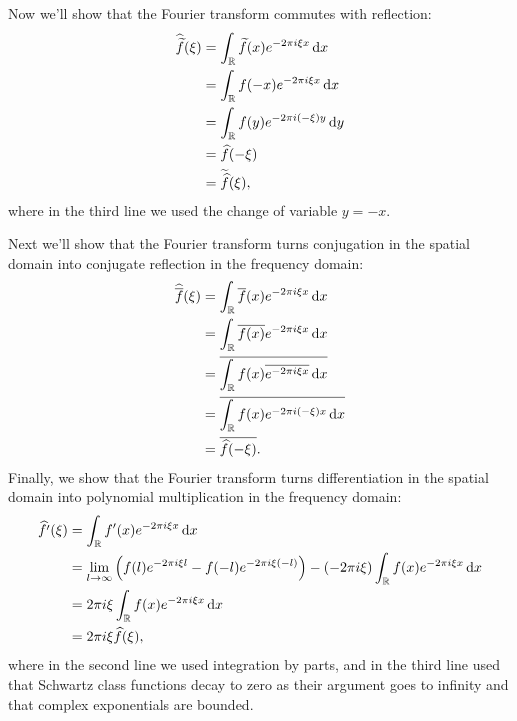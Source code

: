 \documentclass{article}
\newcommand{\R}{\mathbb{R}}
\begin{document}
Now we'll show that the Fourier transform commutes with reflection:
%
\begin{align*}
    \widehat{\widetilde{f}}(\xi)
        &= \int_{\R} \widetilde{f}(x) e^{- 2 \pi i \xi x} \dif x \\
        &= \int_{\R} f(-x) e^{- 2 \pi i \xi x} \dif x \\
        &= \int_{\R} f(y) e^{- 2 \pi i (- \xi) y} \dif y \\
        &= \widehat{f}(- \xi) \\
        &= \widetilde{\widehat{f}}(\xi)
        ,
\end{align*}
%
where in the third line we used the change of variable $y = - x$.

Next we'll show that the Fourier transform turns conjugation in the
spatial domain into conjugate reflection in the frequency domain:
%
\begin{align*}
    \widehat{\overline{f}}(\xi)
        &= \int_{\R} \overline{f}(x) e^{- 2 \pi i \xi x} \dif x \\
        &= \int_{\R} \overline{f(x)} e^{- 2 \pi i \xi x} \dif x \\
        &= \overline{\int_{\R} f(x) \overline{e^{- 2 \pi i \xi x}} \dif x} \\
        &= \overline{\int_{\R} f(x) e^{- 2 \pi i (- \xi) x} \dif x} \\
        &= \overline{\widehat{f}(-\xi)}
        .
\end{align*}
%
Finally, we show that the Fourier transform turns differentiation in
the spatial domain into polynomial multiplication in the frequency domain:
%
\begin{align*}
    \widehat{f^\prime}(\xi)
        &= \int_{\R} f^\prime(x) e^{- 2 \pi i \xi x} \dif x \\
        &=
        \lim_{l \to \infty}
        \del{
        f(l) e^{- 2 \pi i \xi l}
        -
        f(-l) e^{- 2 \pi i \xi (-l)}
        }
        - (- 2 \pi i \xi) \int_{\R} f(x) e^{- 2 \pi i \xi x} \dif x \\
        &= 2 \pi i \xi \int_{\R} f(x) e^{- 2 \pi i \xi x} \dif x \\
        &= 2 \pi i \xi \widehat{f}(\xi)
        ,
\end{align*}
%
where in the second line we used integration by parts, and in the third
line used that Schwartz class functions decay to zero as their argument
goes to infinity and that complex exponentials are bounded.

\newpage
\end{document}
